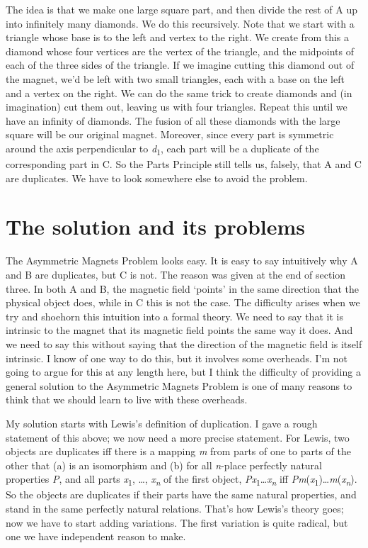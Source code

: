 \documentclass[
  10pt,
  letterpaper,
  DIV=11,
  numbers=noendperiod,
  twoside]{scrartcl}
\begin{document}
The idea is that we make one large square part, and then divide the rest
of A up into infinitely many diamonds. We do this recursively. Note that
we start with a triangle whose base is to the left and vertex to the
right. We create from this a diamond whose four vertices are the vertex
of the triangle, and the midpoints of each of the three sides of the
triangle. If we imagine cutting this diamond out of the magnet, we'd be
left with two small triangles, each with a base on the left and a vertex
on the right. We can do the same trick to create diamonds and (in
imagination) cut them out, leaving us with four triangles. Repeat this
until we have an infinity of diamonds. The fusion of all these diamonds
with the large square will be our original magnet. Moreover, since every
part is symmetric around the axis perpendicular to
\emph{d}\textsubscript{1}, each part will be a duplicate of the
corresponding part in C. So the Parts Principle still tells us, falsely,
that A and C are duplicates. We have to look somewhere else to avoid the
problem.

\section{The solution and its
problems}\label{the-solution-and-its-problems}

The Asymmetric Magnets Problem looks easy. It is easy to say intuitively
why A and B are duplicates, but C is not. The reason was given at the
end of section three. In both A and B, the magnetic field `points' in
the same direction that the physical object does, while in C this is not
the case. The difficulty arises when we try and shoehorn this intuition
into a formal theory. We need to say that it is intrinsic to the magnet
that its magnetic field points the same way it does. And we need to say
this without saying that the direction of the magnetic field is itself
intrinsic. I know of one way to do this, but it involves some overheads.
I'm not going to argue for this at any length here, but I think the
difficulty of providing a general solution to the Asymmetric Magnets
Problem is one of many reasons to think that we should learn to live
with these overheads.

My solution starts with Lewis's definition of duplication. I gave a
rough statement of this above; we now need a more precise statement. For
Lewis, two objects are duplicates iff there is a mapping \emph{m} from
parts of one to parts of the other that (a) is an isomorphism and (b)
for all \emph{n}-place perfectly natural properties \emph{P}, and all
parts \emph{x}\textsubscript{1}, \ldots, \emph{x\textsubscript{n}} of
the first object,
\emph{Px}\textsubscript{1}\ldots{}\emph{x\textsubscript{n}} iff
\emph{Pm}(\emph{x}\textsubscript{1})\ldots{}\emph{m}(\emph{x\textsubscript{n}}).
So the objects are duplicates if their parts have the same natural
properties, and stand in the same perfectly natural relations. That's
how Lewis's theory goes; now we have to start adding variations. The
first variation is quite radical, but one we have independent reason to
make.
\end{document}

